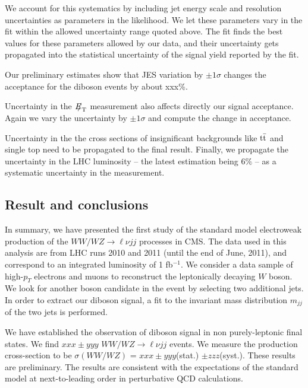 We account for this systematics by including jet energy scale 
and resolution uncertainties as parameters in the likelihood. 
We let these parameters vary in the fit within the allowed 
uncertainty range quoted above. 
The fit finds the best values for these parameters allowed by 
our data, and their uncertainty gets propagated into the 
statistical uncertainty of the signal yield reported by the fit.


Our preliminary estimates show that JES
variation by $\pm 1\sigma$ changes the acceptance for the  
diboson events by about xxx\%.

\par
Uncertainty in the ${E\!\!\!/}_{\mathrm{T}}$ measurement also affects directly our 
signal acceptance. 
Again we vary the uncertainty by $\pm 1\sigma$  and compute the change 
in acceptance.

\par
Uncertainty in the the cross sections of insignificant backgrounds 
like $\mathrm{t}\bar{\mathrm{t}}$ and single top need to be propagated to the 
final result.
Finally, we propagate the uncertainty in the LHC luminosity -- the latest 
estimation being 6$\%$ -- as a systematic uncertainty in the measurement.
\subsection{Result and conclusions\label{sec:conclusion}}
In summary, we have presented the first study of the standard model 
electroweak production of the $WW/WZ\to\ell\nu jj$ processes in CMS. 
The data used in this analysis are from LHC runs 2010 and 2011 (until the 
end of June, 2011), and correspond to an 
integrated luminosity of 1 fb${}^{-1}$. 
We consider a data sample of high-$p_T$ electrons and muons to reconstruct 
the leptonically decaying $W$ boson. 
We look for another boson candidate in the event by selecting two 
additional jets. 
In order to extract our diboson signal, a fit to the invariant mass 
distribution $m_{jj}$ of the two jets is performed. 

\par
We have established the observation of diboson signal in non purely-leptonic 
final states. We find $xxx \pm yyy$ $WW/WZ\to\ell\nu jj$ events. 
We measure the production cross-section to be 
$\sigma(WW/WZ)$ = $xxx \pm yyy$(stat.) $\pm zzz$(syst.). 
These results are preliminary.
The results are consistent with the expectations of the standard model 
at next-to-leading order in perturbative QCD calculations.


